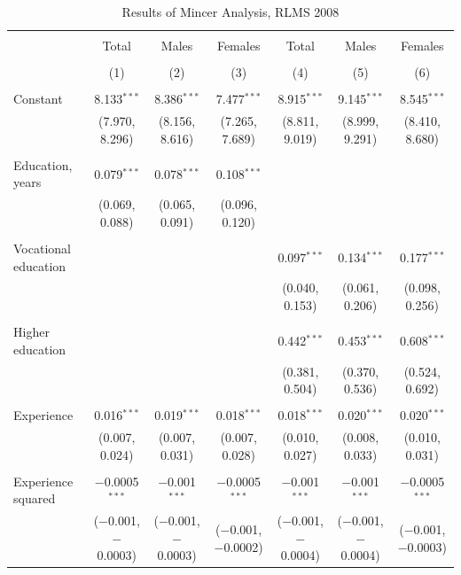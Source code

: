 \documentclass[alpha-refs]{wiley-article-01g}
\begin{document}
\begin{landscape}

\fontsize{9}{11}
\selectfont

\begin{table}[!htbp] \centering 
\renewcommand{\arraystretch}{1.0}
  \caption{Results of Mincer Analysis, RLMS 2008} 
  \label{} 
\begin{tabular}{@{\extracolsep{5pt}}lcccccc} 
\\[-1.8ex]\hline 
\hline \\[-1.8ex] 
 & Total & Males & Females & Total & Males & Females \\ 
\\[-1.8ex] & (1) & (2) & (3) & (4) & (5) & (6)\\ 
\hline \\[-1.8ex] 
 Constant & 8.133$^{***}$ & 8.386$^{***}$ & 7.477$^{***}$ & 8.915$^{***}$ & 9.145$^{***}$ & 8.545$^{***}$ \\ 
  & (7.970, 8.296) & (8.156, 8.616) & (7.265, 7.689) & (8.811, 9.019) & (8.999, 9.291) & (8.410, 8.680) \\ 
  & & & & & & \\ 
 Education, years & 0.079$^{***}$ & 0.078$^{***}$ & 0.108$^{***}$ &  &  &  \\ 
  & (0.069, 0.088) & (0.065, 0.091) & (0.096, 0.120) &  &  &  \\ 
  & & & & & & \\ 
 Vocational education &  &  &  & 0.097$^{***}$ & 0.134$^{***}$ & 0.177$^{***}$ \\ 
  &  &  &  & (0.040, 0.153) & (0.061, 0.206) & (0.098, 0.256) \\ 
  & & & & & & \\ 
 Higher education &  &  &  & 0.442$^{***}$ & 0.453$^{***}$ & 0.608$^{***}$ \\ 
  &  &  &  & (0.381, 0.504) & (0.370, 0.536) & (0.524, 0.692) \\ 
  & & & & & & \\ 
 Experience & 0.016$^{***}$ & 0.019$^{***}$ & 0.018$^{***}$ & 0.018$^{***}$ & 0.020$^{***}$ & 0.020$^{***}$ \\ 
  & (0.007, 0.024) & (0.007, 0.031) & (0.007, 0.028) & (0.010, 0.027) & (0.008, 0.033) & (0.010, 0.031) \\ 
  & & & & & & \\ 
 Experience squared & $-$0.0005$^{***}$ & $-$0.001$^{***}$ & $-$0.0005$^{***}$ & $-$0.001$^{***}$ & $-$0.001$^{***}$ & $-$0.0005$^{***}$ \\ 
  & ($-$0.001, $-$0.0003) & ($-$0.001, $-$0.0003) & ($-$0.001, $-$0.0002) & ($-$0.001, $-$0.0004) & ($-$0.001, $-$0.0004) & ($-$0.001, $-$0.0003) \\ 

\end{tabular}
\end{table}
\end{landscape}
\end{document}

